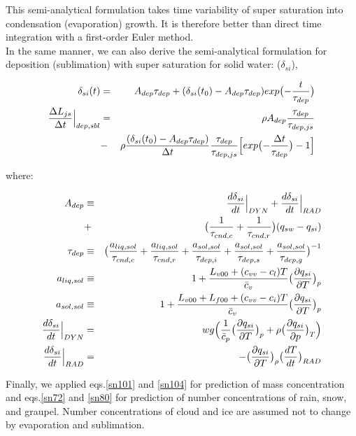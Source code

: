 This semi-analytical formulation takes time variability of super saturation into condensation (evaporation) growth. It is therefore better than direct time integration with a first-order Euler method.\\
In the same manner, we can also derive the semi-analytical formulation for deposition (sublimation) with super saturation for solid water: ($\delta_{si}$),

\begin{eqnarray}
\delta_{si}(t)&=&A_{dep}\tau_{dep}+(\delta_{si}(t_{0})-A_{dep}\tau_{dep})exp\bigl(-\frac{t}{\tau_{dep}}\bigr)\label{sn103}\\
\frac{\Delta L_{js}}{\Delta t}\Bigr|_{dep,sbl}&=&\rho A_{dep}\frac{\tau_{dep}}{\tau_{dep,js}}\nonumber\\
&-&\rho\frac{(\delta_{si}(t_{0})-A_{dep}\tau_{dep})}{\Delta t}\frac{\tau_{dep}}{\tau_{dep,js}}\Bigl[exp\bigl(-\frac{\Delta t}{\tau_{dep}}\bigr)-1\Bigr]\label{sn104}
\end{eqnarray}

where:

\begin{eqnarray}
A_{dep}&\equiv&\frac{d\delta_{si}}{dt}\Bigr|_{DYN}+\frac{d\delta_{si}}{dt}\Bigr|_{RAD}\nonumber\\
&+&\bigl(\frac{1}{\tau_{cnd,c}}+\frac{1}{\tau_{cnd,r}}\bigr)(q_{sw}-q_{si})\label{sn105}\\
\tau_{dep}&\equiv&\bigl(\frac{a_{liq,sol}}{\tau_{cnd,c}}+\frac{a_{liq,sol}}{\tau_{cnd,r}}+\frac{a_{sol,sol}}{\tau_{dep,i}}+\frac{a_{sol,sol}}{\tau_{dep,s}}+\frac{a_{sol,sol}}{\tau_{dep,g}}\bigr)^{-1}\label{sn106}\\
a_{liq,sol}&\equiv&1+\frac{L_{v00}+(c_{vv}-c_{l})T}{\bar{c}_{v}}\bigl(\frac{\partial q_{si}}{\partial T}\bigr)_{p}\nonumber\\
a_{sol,sol}&\equiv&1+\frac{L_{v00}+L_{f00}+(c_{vv}-c_{i})T}{\bar{c}_{v}}\bigl(\frac{\partial q_{si}}{\partial T}\bigr)_{p}\nonumber\\
\frac{d\delta_{si}}{dt}\Bigr|_{DYN}&=&wg\Bigl(\frac{1}{\bar{c}_{p}}\bigl(\frac{\partial q_{si}}{\partial T}\bigr)_{p}+\rho\bigl(\frac{\partial q_{si}}{\partial p}\bigr)_{T}\Bigr)\nonumber\\
\frac{d\delta_{si}}{dt}\Bigl|_{RAD}&=&-\bigl(\frac{\partial q_{si}}{\partial T}\bigr)_{\rho}\bigl(\frac{dT}{dt}\bigr)_{RAD}\nonumber
\end{eqnarray}

Finally, we applied eqs.\ref{sn101} and \ref{sn104} for prediction of mass concentration and eqs.\ref{sn72} and \ref{sn80} for prediction of number concentrations of rain, snow, and graupel. Number concentrations of cloud and ice are assumed not to change by evaporation and sublimation.


